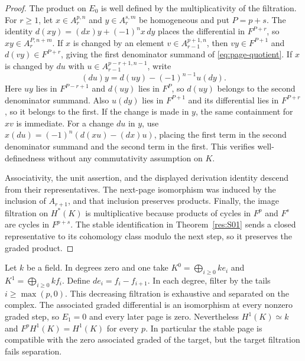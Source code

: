 \begin{proof}
The product on $E_0$ is well defined by the multiplicativity of
the filtration. For $r\geq1$, let $x\in A_r^{p,n}$ and
$y\in A_r^{s,m}$ be homogeneous and put $P=p+s$. The identity
$d(xy)=(dx)y+(-1)^n x\,dy$ places the differential in
$F^{P+r}$, so $xy\in A_r^{P,n+m}$. If $x$ is changed by an
element $v\in A_{r-1}^{p+1,n}$, then $v y\in F^{P+1}$ and
$d(vy)\in F^{P+r}$, giving the first denominator summand of
\eqref{eq:page-quotient}. If $x$ is changed by $du$ with
$u\in A_{r-1}^{p-r+1,n-1}$, write
\[
 (du)y=d(uy)-(-1)^{n-1}u(dy).
\]
Here $uy$ lies in $F^{P-r+1}$ and $d(uy)$ lies in $F^P$,
so $d(uy)$ belongs to the second denominator summand.
Also $u(dy)$ lies in $F^{P+1}$ and its differential lies in
$F^{P+r}$, so it belongs to the first. If the change is made in
$y$, the same containment for $xv$ is immediate. For a change
$du$ in $y$, use $x(du)=(-1)^n(d(xu)-(dx)u)$, placing the
first term in the second denominator summand and the second
term in the first. This verifies well-definedness without any
commutativity assumption on $K$.

Associativity, the unit assertion, and the displayed derivation
identity descend from their representatives. The next-page
isomorphism was induced by the inclusion of $A_{r+1}$, and
that inclusion preserves products. Finally, the image filtration
on $H^*(K)$ is multiplicative because products of cycles in
$F^p$ and $F^s$ are cycles in $F^{p+s}$. The stable
identification in Theorem~\ref{res:S01} sends a closed
representative to its cohomology class modulo the next step,
so it preserves the graded product.
\end{proof}

\begin{example}
\label{res:S07}
Let $k$ be a field. In degrees zero and one take
$K^0=\bigoplus_{i\geq0} k e_i$ and $K^1=\bigoplus_{i\geq0} k f_i$.
Define $d e_i=f_i-f_{i+1}$. In each degree, filter by the tails
$i\geq\max(p,0)$. This decreasing filtration is exhaustive and
separated on the complex. The associated graded differential is
an isomorphism at every nonzero graded step, so $E_1=0$ and
every later page is zero. Nevertheless $H^1(K)\simeq k$ and
$F^pH^1(K)=H^1(K)$ for every $p$. In particular the stable
page is compatible with the zero associated graded of the target,
but the target filtration fails separation.
\end{example}

